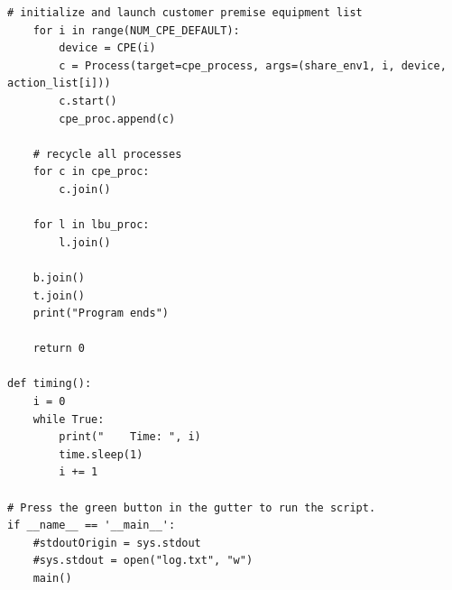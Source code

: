 \begin{lstlisting}[caption={Selected main process code in Python simulation},captionpos=b]
    # initialize and launch customer premise equipment list
    for i in range(NUM_CPE_DEFAULT):
        device = CPE(i)
        c = Process(target=cpe_process, args=(share_env1, i, device, action_list[i]))
        c.start()
        cpe_proc.append(c)

    # recycle all processes
    for c in cpe_proc:
        c.join()

    for l in lbu_proc:
        l.join()

    b.join()
    t.join()
    print("Program ends")

    return 0

def timing():
    i = 0
    while True:
        print("    Time: ", i)
        time.sleep(1)
        i += 1
        
# Press the green button in the gutter to run the script.
if __name__ == '__main__':
    #stdoutOrigin = sys.stdout
    #sys.stdout = open("log.txt", "w")
    main()
\end{lstlisting}



